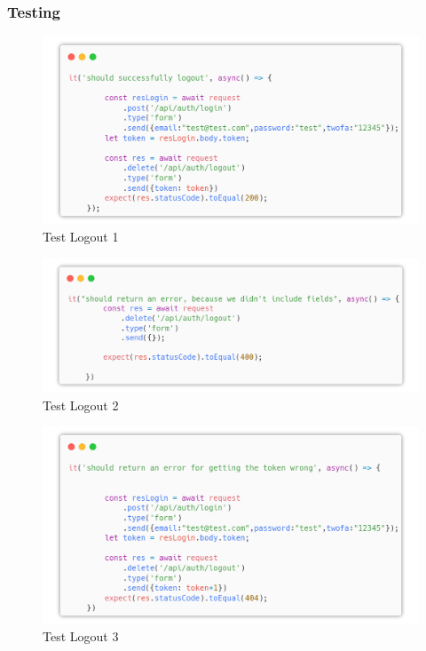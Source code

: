 \documentclass{report}
\begin{document}
\subsubsection*{Testing}
\begin{figure}[H]
	\centering\includegraphics[width=1\textwidth]{images/microservizio-autenticazione/tests/logout_test_1.png}
	\caption{Test Logout 1}
\end{figure}
\begin{figure}[H]
	\centering\includegraphics[width=1\textwidth]{images/microservizio-autenticazione/tests/logout_test_2.png}
	\caption{Test Logout 2}
\end{figure}
\begin{figure}[H]
	\centering\includegraphics[width=1\textwidth]{images/microservizio-autenticazione/tests/logout_test_3.png}
	\caption{Test Logout 3}
\end{figure}
\end{document}
